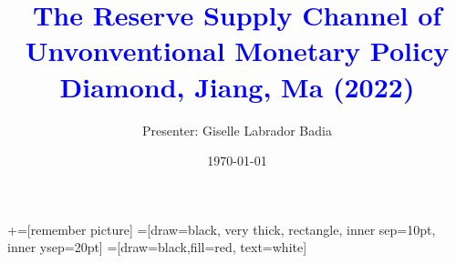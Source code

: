 \documentclass[notes,11pt, aspectratio=169]{beamer}
\title[]{\textcolor{blue}{The Reserve Supply Channel of Unvonventional Monetary Policy \\ Diamond, Jiang, Ma (2022)}}
\author{ Presenter: Giselle Labrador Badia}
\date{\today}
\begin{document}
\newcommand\marktopleft[1]{%
    \tikz[overlay,remember picture] 
        \node (marker-#1-a) at (-.3em,.3em) {};%
}
\newcommand\markbottomright[2]{%
    \tikz[overlay,remember picture] 
        \node (marker-#1-b) at (0em,0em) {};%
}
+=[remember picture] 
 =[draw=black, very thick, rectangle, inner sep=10pt, inner ysep=20pt]
 =[draw=black,fill=red, text=white]

\begin{frame}
  \maketitle
\end{frame}




  
  
  
\end{document}
